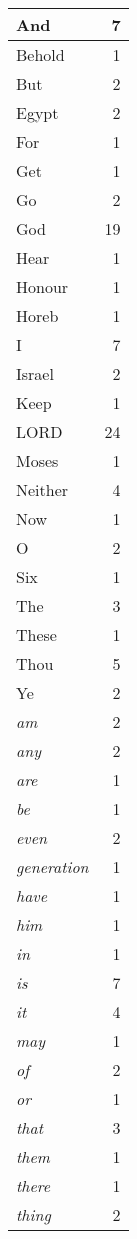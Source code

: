 \begin{center}
\begin{longtable}{l|r}
\hline \hline
\endlastfoot
And & 7 \\ \hline
Behold & 1 \\ \hline
But & 2 \\ \hline
Egypt & 2 \\ \hline
For & 1 \\ \hline
Get & 1 \\ \hline
Go & 2 \\ \hline
God & 19 \\ \hline
Hear & 1 \\ \hline
Honour & 1 \\ \hline
Horeb & 1 \\ \hline
I & 7 \\ \hline
Israel & 2 \\ \hline
Keep & 1 \\ \hline
LORD & 24 \\ \hline
Moses & 1 \\ \hline
Neither & 4 \\ \hline
Now & 1 \\ \hline
O & 2 \\ \hline
Six & 1 \\ \hline
The & 3 \\ \hline
These & 1 \\ \hline
Thou & 5 \\ \hline
Ye & 2 \\ \hline
\emph{am} & 2 \\ \hline
\emph{any} & 2 \\ \hline
\emph{are} & 1 \\ \hline
\emph{be} & 1 \\ \hline
\emph{even} & 2 \\ \hline
\emph{generation} & 1 \\ \hline
\emph{have} & 1 \\ \hline
\emph{him} & 1 \\ \hline
\emph{in} & 1 \\ \hline
\emph{is} & 7 \\ \hline
\emph{it} & 4 \\ \hline
\emph{may} & 1 \\ \hline
\emph{of} & 2 \\ \hline
\emph{or} & 1 \\ \hline
\emph{that} & 3 \\ \hline
\emph{them} & 1 \\ \hline
\emph{there} & 1 \\ \hline
\emph{thing} & 2 \\ \hline

\end{longtable}
\end{center}
